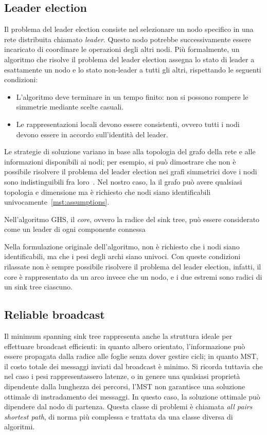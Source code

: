 \documentclass[target=bach,aauheader=,style=]{thud}
\newcommand{\eng}[1]{\foreignlanguage{english}{#1}}
\begin{document}
\subsection{Leader \eng{election}}\label{ghs:election}

Il problema del leader \eng{election} consiste nel selezionare un nodo specifico in una rete distribuita chiamato \emph{leader}. Questo nodo potrebbe successivamente essere incaricato di coordinare le operazioni degli altri nodi. Più formalmente, un algoritmo che risolve il problema del leader \eng{election} assegna lo stato di leader a esattamente un nodo e lo stato \eng{non-leader} a tutti gli altri, rispettando le seguenti condizioni:
\begin{itemize}
    \item L'algoritmo deve terminare in un tempo finito: non si possono rompere le simmetrie mediante scelte casuali.
    \item Le rappresentazioni locali devono essere consistenti, ovvero tutti i nodi devono essere in accordo sull'identità del leader.
\end{itemize}
Le strategie di soluzione variano in base alla topologia del grafo della rete e alle informazioni disponibili ai nodi; per esempio, si può dimostrare che non è possibile risolvere il problema del leader \eng{election} nei grafi simmetrici dove i nodi sono indistinguibili fra loro~\cite{Wattenhofer_2020}. Nel nostro caso, la il grafo può avere qualsiasi topologia e dimensione ma è richiesto che nodi siano identificabili univocamente~\ref{mst:assumptions}.

Nell'algoritmo GHS, il \emph{core}, ovvero la radice del \eng{sink tree}, può essere considerato come un leader di ogni componente connessa
\bigskip

Nella formulazione originale dell'algoritmo, non è richiesto che i nodi siano identificabili, ma che i pesi degli archi siano univoci. Con queste condizioni rilassate non è sempre possibile risolvere il problema del leader \eng{election}, infatti, il core è rappresentato da un arco invece che un nodo, e i due estremi sono radici di un \eng{sink tree} ciascuno.

\subsection{\eng{Reliable broadcast}}\label{ghs:broadcast}

Il \eng{minimum spanning sink tree} rappresenta anche la struttura ideale per effettuare \eng{broadcast} efficienti: in quanto albero orientato, l'informazione può essere propagata dalla radice alle foglie senza dover gestire cicli; in quanto MST, il costo totale dei messaggi inviati dal \eng{broadcast} è minimo. Si ricorda tuttavia che nel caso i pesi rappresentassero latenze, o in genere una qualsiasi proprietà dipendente dalla lunghezza dei percorsi, l'MST non garantisce una soluzione ottimale di instradamento dei messaggi. In questo caso, la soluzione ottimale può dipendere dal nodo di partenza. Questa classe di problemi è chiamata \eng{\emph{all pairs shortest path}}, di norma più complessa e trattata da una classe diversa di algoritmi.
\end{document}
